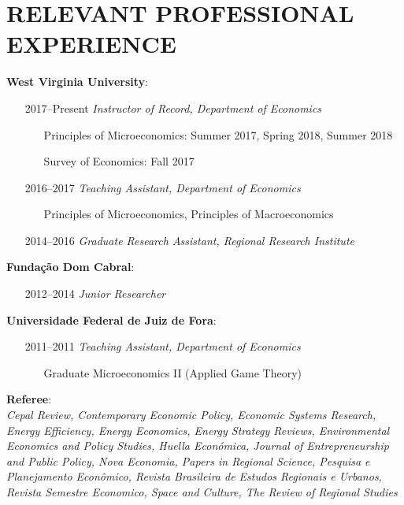 \documentclass[11pt,a4paper,oneside]{article}
\begin{document}
\section{RELEVANT PROFESSIONAL EXPERIENCE}
\noindent \textbf{West Virginia University}:
\begin{itemize}[align=left]
  \item[2017--Present] \emph{Instructor of Record, Department of Economics}
  \begin{itemize}
    \item[] Principles of Microeconomics: Summer 2017, Spring 2018, Summer 2018
    \item[] Survey of Economics: Fall 2017
  \end{itemize}

  \item[2016--2017] \emph{Teaching Assistant, Department of Economics}
  \begin{itemize}
    \item[] Principles of Microeconomics, Principles of Macroeconomics
  \end{itemize}

	\item[2014--2016] \emph{Graduate Research Assistant, Regional Research Institute}
\end{itemize}

\noindent \textbf{Funda\c{c}\~ao Dom Cabral}:
\begin{itemize}[align=left]
  \item[2012--2014] \emph{Junior Researcher}
\end{itemize}

\noindent \textbf{Universidade Federal de Juiz de Fora}:
\begin{itemize}[align=left]
  \item[2011--2011] \emph{Teaching Assistant, Department of Economics}
  \begin{itemize}
    \item[] Graduate Microeconomics II (Applied Game Theory)
  \end{itemize}
\end{itemize}

\noindent \textbf{Referee}:\\
 \emph{Cepal Review, Contemporary Economic Policy, Economic Systems Research, Energy Efficiency, Energy Economics, Energy Strategy Reviews, Environmental Economics and Policy Studies, Huella Econ\'omica, Journal of Entrepreneurship  and Public Policy, Nova Economia, Papers in Regional Science, Pesquisa e Planejamento Econ\^omico, Revista Brasileira de Estudos Regionais e Urbanos, Revista Semestre Economico, Space and Culture, The Review of Regional Studies}
\end{document}
